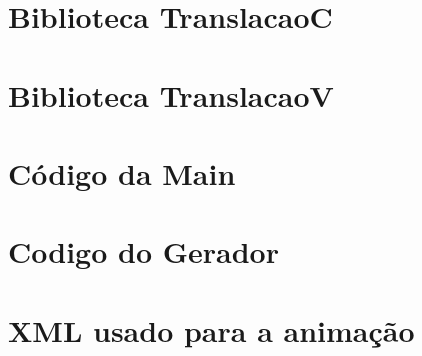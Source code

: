 \documentclass{article}
\begin{document}
\section{Biblioteca TranslacaoC}


\newpage

\section{Biblioteca TranslacaoV}


\newpage

\section{Código da Main}

\newpage

\section{Codigo do Gerador}

\newpage

\section{XML usado para a animação}

\end{document}
